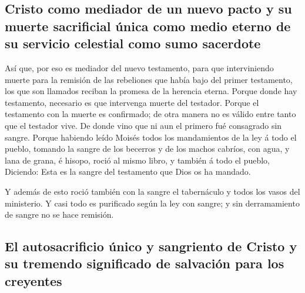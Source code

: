 \hypertarget{cristo-como-mediador-de-un-nuevo-pacto-y-su-muerte-sacrificial-uxfanica-como-medio-eterno-de-su-servicio-celestial-como-sumo-sacerdote}{%
\subsection{Cristo como mediador de un nuevo pacto y su muerte
sacrificial única como medio eterno de su servicio celestial como sumo
sacerdote}\label{cristo-como-mediador-de-un-nuevo-pacto-y-su-muerte-sacrificial-uxfanica-como-medio-eterno-de-su-servicio-celestial-como-sumo-sacerdote}}

 Así que, por eso es mediador del nuevo testamento, para
que interviniendo muerte para la remisión de las rebeliones que había
bajo del primer testamento, los que son llamados reciban la promesa de
la herencia eterna.  Porque donde hay testamento,
necesario es que intervenga muerte del testador.  Porque
el testamento con la muerte es confirmado; de otra manera no es válido
entre tanto que el testador vive.  De donde vino que ni
aun el primero fué consagrado sin sangre.  Porque
habiendo leído Moisés todos los mandamientos de la ley á todo el pueblo,
tomando la sangre de los becerros y de los machos cabríos, con agua, y
lana de grana, é hisopo, roció al mismo libro, y también á todo el
pueblo,  Diciendo: Esta es la sangre del testamento que
Dios os ha mandado.

 Y además de esto roció también con la sangre el
tabernáculo y todos los vasos del ministerio.  Y casi
todo es purificado según la ley con sangre; y sin derramamiento de
sangre no se hace remisión.

\hypertarget{el-autosacrificio-uxfanico-y-sangriento-de-cristo-y-su-tremendo-significado-de-salvaciuxf3n-para-los-creyentes}{%
\subsection{El autosacrificio único y sangriento de Cristo y su tremendo
significado de salvación para los
creyentes}\label{el-autosacrificio-uxfanico-y-sangriento-de-cristo-y-su-tremendo-significado-de-salvaciuxf3n-para-los-creyentes}}

